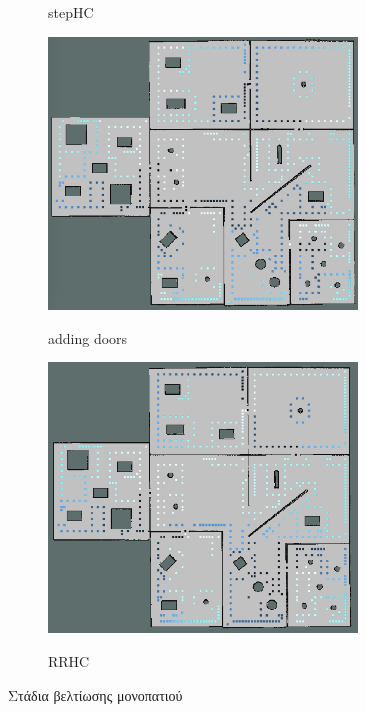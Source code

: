 \begin{figure}[!htb]
\begin{subfigure}[b]{0.5\textwidth}
         \caption{stepHC}
     \end{subfigure}
     \hfill
     \begin{subfigure}[b]{0.5\textwidth}
         \centering
         \includegraphics[width=0.9\textwidth]{./images/chapter5/wf_optimization_3_added_doors.png}
         \label{fig:wf_optimization_3_added_doors}
         \caption{adding doors}
     \end{subfigure}%
     \begin{subfigure}[b]{0.5\textwidth}
         \centering
         \includegraphics[width=0.9\textwidth]{./images/chapter5/wf_optimization_4_rrhc.png}
         \label{fig:wf_optimization_4_rrhc}
         \caption{RRHC}
     \end{subfigure}
    \caption{Στάδια βελτίωσης μονοπατιού}
    \label{fig:wall_follow_optimization_example}
\end{figure}



